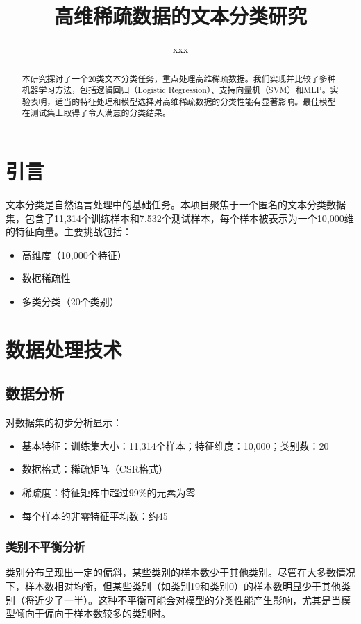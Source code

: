 \documentclass[11pt,a4paper]{article}
\begin{document}
\title{\Large 高维稀疏数据的文本分类研究}

\author{xxx}

\date{}  %

\maketitle

\begin{abstract}
本研究探讨了一个20类文本分类任务，重点处理高维稀疏数据。我们实现并比较了多种机器学习方法，包括逻辑回归（Logistic Regression）、支持向量机（SVM）和MLP。实验表明，适当的特征处理和模型选择对高维稀疏数据的分类性能有显著影响。最佳模型在测试集上取得了令人满意的分类结果。
\end{abstract}

\section{引言}
文本分类是自然语言处理中的基础任务。本项目聚焦于一个匿名的文本分类数据集，包含了11,314个训练样本和7,532个测试样本，每个样本被表示为一个10,000维的特征向量。主要挑战包括：
\begin{itemize}
    \item 高维度（10,000个特征）
    \item 数据稀疏性
    \item 多类分类（20个类别）
\end{itemize}

\section{数据处理技术}
\subsection{数据分析}
对数据集的初步分析显示：
\begin{itemize}
    \item 基本特征：训练集大小：11,314个样本；特征维度：10,000；类别数：20
    \item 数据格式：稀疏矩阵（CSR格式）
    \item 稀疏度：特征矩阵中超过99\%的元素为零
    \item 每个样本的非零特征平均数：约45
\end{itemize}
\subsubsection{类别不平衡分析}
类别分布呈现出一定的偏斜，某些类别的样本数少于其他类别。尽管在大多数情况下，样本数相对均衡，但某些类别（如类别19和类别0）的样本数明显少于其他类别（将近少了一半）。这种不平衡可能会对模型的分类性能产生影响，尤其是当模型倾向于偏向于样本数较多的类别时。
\end{document}
